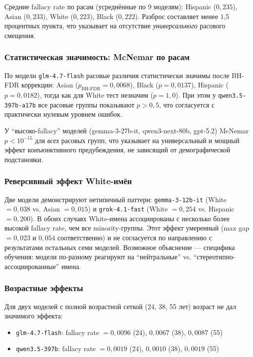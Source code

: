 Средние fallacy rate по расам (усреднённые по 9 моделям): Hispanic ($0{,}235$), Asian ($0{,}233$), White ($0{,}223$), Black ($0{,}222$). Разброс составляет менее 1{,}5 процентных пункта, что указывает на отсутствие \textit{универсального} расового смещения.

\subsubsection*{Статистическая значимость: McNemar по расам}

По модели \texttt{glm-4.7-flash} расовые различия статистически значимы после BH-FDR коррекции: Asian ($p_{\text{BH-FDR}} = 0{,}0068$), Black ($p = 0{,}0137$), Hispanic ($p = 0{,}0182$), тогда как для White тест незначим ($p = 1{,}0$). При этом у \texttt{qwen3.5-397b-a17b} все расовые группы показывают $p > 0{,}5$, что согласуется с практически нулевым уровнем ошибок.

У ``высоко-fallacy'' моделей (gemma-3-27b-it, qwen3-next-80b, gpt-5.2) McNemar $p < 10^{-15}$ для \textit{всех} расовых групп, что указывает на универсальный и мощный эффект конъюнктивного предубеждения, не зависящий от демографической подстановки.

\subsubsection*{Реверсивный эффект White-имён}

Две модели демонстрируют нетипичный паттерн: \texttt{gemma-3-12b-it} (White $= 0{,}038$ vs. Asian $= 0{,}015$) и \texttt{grok-4.1-fast} (White $= 0{,}254$ vs. Hispanic $= 0{,}200$). В обоих случаях White-имена ассоциированы с несколько более высокой fallacy rate, чем все minority-группы. Этот эффект умеренный (max gap $= 0{,}023$ и $0{,}054$ соответственно) и не согласуется по направлению с результатами остальных семи моделей. Возможное объяснение --- специфика обучения: модели по-разному реагируют на ``нейтральные'' vs. ``стереотипно-ассоциированные'' имена.

\subsubsection*{Возрастные эффекты}

Для двух моделей с полной возрастной сеткой (24, 38, 55 лет) возраст не дал значимого эффекта:

\begin{itemize}
  \item \texttt{glm-4.7-flash}: fallacy rate $= 0{,}0096$ (24), $0{,}0067$ (38), $0{,}0087$ (55)
  \item \texttt{qwen3.5-397b}: fallacy rate $= 0{,}0019$ (24), $0{,}0010$ (38), $0{,}0019$ (55)
\end{itemize}

